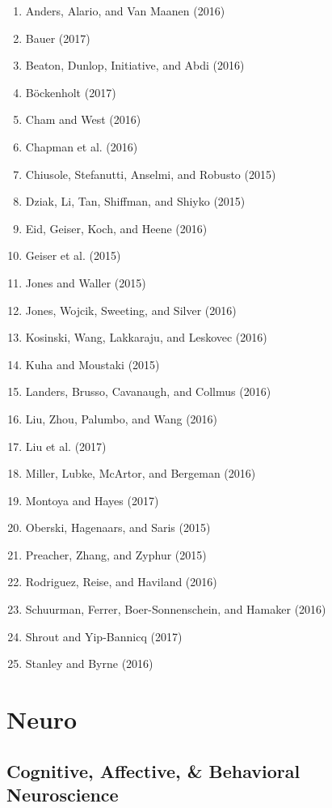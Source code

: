 \documentclass[english,man]{apa6}
\providecommand{\tightlist}{%
  \setlength{\itemsep}{0pt}\setlength{\parskip}{0pt}}
\begin{document}
\begin{enumerate}
\def\labelenumi{\arabic{enumi})}
\tightlist
\item
  Anders, Alario, and Van Maanen (2016)
\item
  Bauer (2017)
\item
  Beaton, Dunlop, Initiative, and Abdi (2016)
\item
  Böckenholt (2017)
\item
  Cham and West (2016)
\item
  Chapman et al. (2016)
\item
  Chiusole, Stefanutti, Anselmi, and Robusto (2015)
\item
  Dziak, Li, Tan, Shiffman, and Shiyko (2015)
\item
  Eid, Geiser, Koch, and Heene (2016)
\item
  Geiser et al. (2015)
\item
  Jones and Waller (2015)
\item
  Jones, Wojcik, Sweeting, and Silver (2016)
\item
  Kosinski, Wang, Lakkaraju, and Leskovec (2016)
\item
  Kuha and Moustaki (2015)
\item
  Landers, Brusso, Cavanaugh, and Collmus (2016)
\item
  Liu, Zhou, Palumbo, and Wang (2016)
\item
  Liu et al. (2017)
\item
  Miller, Lubke, McArtor, and Bergeman (2016)
\item
  Montoya and Hayes (2017)
\item
  Oberski, Hagenaars, and Saris (2015)
\item
  Preacher, Zhang, and Zyphur (2015)
\item
  Rodriguez, Reise, and Haviland (2016)
\item
  Schuurman, Ferrer, Boer-Sonnenschein, and Hamaker (2016)
\item
  Shrout and Yip-Bannicq (2017)
\item
  Stanley and Byrne (2016)
\end{enumerate}

\section{Neuro}\label{neuro}

\subsection{Cognitive, Affective, \& Behavioral
Neuroscience}\label{cognitive-affective-behavioral-neuroscience}
\end{document}
